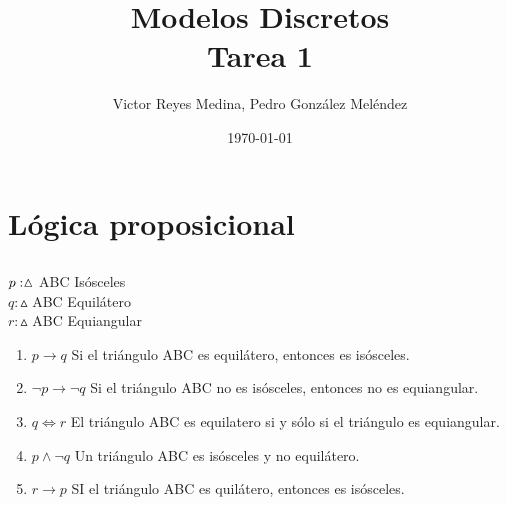 \documentclass[11pt]{utalcaDoc}
\title{{\bf Modelos Discretos}\\Tarea 1}
\author{Victor Reyes Medina,  Pedro González Meléndez}
\date{\today}
\begin{document}
\renewcommand{\figurename}{Figura~}
\renewcommand{\tablename}{Tabla~}
\renewcommand{\theenumii}{\arabic{enumii}}
\renewcommand{\labelenumii}{%
  \theenumii.
}
\maketitle

\section{Lógica proposicional}

\subsection{ } %

$\\p:  \vartriangle$ ABC Isósceles \\
$q:  \vartriangle$ ABC Equilátero \\
$r:  \vartriangle$ ABC Equiangular\\

\begin{enumerate}
\item $p \to q$ Si el triángulo ABC es equilátero, entonces es isósceles.
\item $\neg p \to \neg q$ Si el triángulo ABC no es isósceles, entonces no es equiangular. 
\item $q \iff r$ El triángulo ABC es equilatero si y sólo si el triángulo es equiangular. 
\item $p \wedge \neg q$ Un triángulo ABC es isósceles y no equilátero.
\item $r \to p$ SI el triángulo ABC es quilátero, entonces es isósceles.
\end{enumerate}

\newpage 
\end{document}
